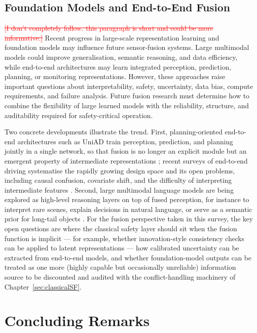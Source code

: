 \documentclass[11pt,oneside,openany]{book}
\newcommand{\deleted}[1]{\textcolor{red}{\sout{#1}}}
\newcommand{\addednew}[1]{\textcolor{RevisionOlive}{#1}}
\begin{document}
\section{Foundation Models and End-to-End Fusion}
\deleted{[I don't completely follow. this paragraph is short and could be more informative.]}
Recent progress in large-scale representation learning and foundation models may influence future sensor-fusion systems. Large multimodal models could improve generalisation, semantic reasoning, and data efficiency, while end-to-end architectures may learn integrated perception, prediction, planning, or monitoring representations. However, these approaches raise important questions about interpretability, safety, uncertainty, data bias, compute requirements, and failure analysis. Future fusion research must determine how to combine the flexibility of large learned models with the reliability, structure, and auditability required for safety-critical operation.

\addednew{Two concrete developments illustrate the trend. First, planning-oriented end-to-end architectures such as UniAD train perception, prediction, and planning jointly in a single network, so that fusion is no longer an explicit module but an emergent property of intermediate representations \cite{hu2023_uniad}; recent surveys of end-to-end driving systematise the rapidly growing design space and its open problems, including causal confusion, covariate shift, and the difficulty of interpreting intermediate features \cite{chen2024_e2e_survey}. Second, large multimodal language models are being explored as high-level reasoning layers on top of fused perception, for instance to interpret rare scenes, explain decisions in natural language, or serve as a semantic prior for long-tail objects \cite{cui2024_mllm_driving}. For the fusion perspective taken in this survey, the key open questions are where the classical safety layer should sit when the fusion function is implicit --- for example, whether innovation-style consistency checks can be applied to latent representations --- how calibrated uncertainty can be extracted from end-to-end models, and whether foundation-model outputs can be treated as one more (highly capable but occasionally unreliable) information source to be discounted and audited with the conflict-handling machinery of Chapter~\ref{sec:classicalSF}.}

\chapter{Concluding Remarks}
\label{sec:conclusions}
\end{document}
